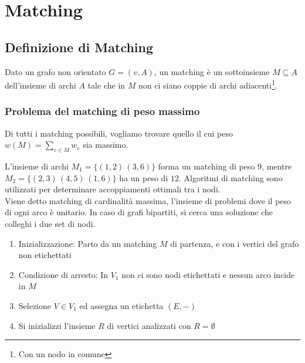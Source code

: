 \documentclass[../template]{subfiles}
\begin{document}
\section{Matching}
\subsection{Definizione di Matching}
Dato un grafo non orientato $G = (v, A)$, un matching è un sottoinsieme $M \subseteq A$ dell'insieme di archi $A$ tale che
in $M$ non ci siano coppie di archi adiacenti\footnote{Con un nodo in comune}.
\subsubsection{Problema del matching di peso massimo}
Di tutti i matching possibili, vogliamo trovare quello il cui peso $w(M) = \sum_{e \in M} w_e$ sia massimo.

\begin{figure}[h]
    \centering
\end{figure}

\noindent L'insieme di archi $M_1 = \{ (1, 2) \, (3, 6)\}$ forma un matching di peso $9$, mentre $M_2 = \{(2, 3)\,(4, 5)\,(1, 6)\}$ ha un peso
di $12$.
Algoritmi di matching sono utilizzati per determinare accoppiamenti ottimali tra i nodi.
\\[10pt]
Viene detto matching di cardinalità massima, l'insieme di problemi dove il peso di ogni arco è unitario.
In caso di grafi bipartiti, si cerca una soluzione che colleghi i due set di nodi.

\begin{enumerate}
    \item Inizializzazione: Parto da un matching $M$ di partenza, e con i vertici del
        grafo non etichettati
    \item Condizione di arresto: In $V_1$ non ci sono nodi etichettati e nessun arco incide in $M$
    \item Selezione $V \in V_1$ ed assegna un etichetta $(E, -)$
    \item Si inizializzi l'insieme $R$ di vertici analizzati con $R = \emptyset$
\end{enumerate}
\end{document}

